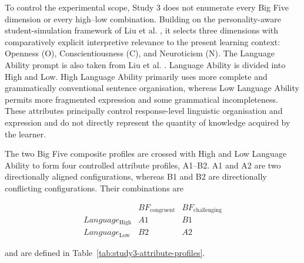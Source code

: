 To control the experimental scope, Study 3 does not enumerate every Big Five dimension or every high--low combination. Building on the personality-aware student-simulation framework of Liu et al. \cite{liu-etal-2024-personality}, it selects three dimensions with comparatively explicit interpretive relevance to the present learning context: Openness (O), Conscientiousness (C), and Neuroticism (N). The Language Ability prompt is also taken from Liu et al. \cite{liu-etal-2024-personality}. Language Ability is divided into High and Low. High Language Ability primarily uses more complete and grammatically conventional sentence organisation, whereas Low Language Ability permits more fragmented expression and some grammatical incompleteness. These attributes principally control response-level linguistic organisation and expression and do not directly represent the quantity of knowledge acquired by the learner.

The two Big Five composite profiles are crossed with High and Low Language Ability to form four controlled attribute profiles, A1--B2. A1 and A2 are two directionally aligned configurations, whereas B1 and B2 are directionally conflicting configurations. Their combinations are

\[
\begin{array}{c|cc}
 & BF_{\mathrm{congruent}} & BF_{\mathrm{challenging}} \\
\hline
Language_{\mathrm{High}} & A1 & B1 \\
Language_{\mathrm{Low}} & B2 & A2
\end{array}
\]

and are defined in Table~\ref{tab:study3-attribute-profiles}.

